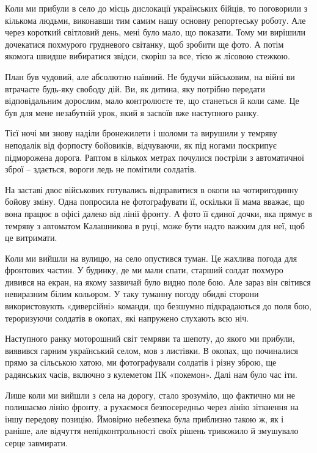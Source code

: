 Коли ми прибули в село до місць дислокації українських бійців, то поговорили з
кількома людьми, виконавши тим самим нашу основну репортеську роботу. Але через
короткий світловий день, мені було мало, що показати. Тому ми вирішили
дочекатися похмурого грудневого світанку, щоб зробити ще фото. А потім якомога
швидше вибиратися звідси, скоріш за все, тією ж лісовою стежкою.

План був чудовий, але абсолютно наївний. Не будучи військовим, на війні ви
втрачаєте будь-яку свободу дій. Ви, як дитина, яку потрібно передати
відповідальним дорослим, мало контролюєте те, що станеться й коли саме. Це був
для мене незабутній урок, який я засвоїв вже наступного ранку.


Тієї ночі ми знову наділи бронежилети і шоломи та вирушили у темряву неподалік
від форпосту бойовиків, відчуваючи, як під ногами поскрипує підморожена дорога.
Раптом в кількох метрах почулися постріли з автоматичної зброї – здається,
вороги ледь не помітили солдатів.


На заставі двоє військових готувались відправитися в окопи на чотиригодинну
бойову зміну. Одна попросила не фотографувати її, оскільки її мама вважає, що
вона працює в офісі далеко від лінії фронту. А фото її єдиної дочки, яка прямує
в темряву з автоматом Калашникова в руці, може бути надто важким для неї, щоб
це витримати.

Коли ми вийшли на вулицю, на село опустився туман. Це жахлива погода для
фронтових частин. У будинку, де ми мали спати, старший солдат похмуро дивився
на екран, на якому зазвичай було видно поле бою. Але зараз він світився
невиразним білим кольором. У таку туманну погоду обидві сторони використовують
«диверсійні» команди, що безшумно підкрадаються до поля бою, тероризуючи
солдатів в окопах, які напружено слухають всю ніч.

Наступного ранку моторошний світ темряви та шепоту, до якого ми прибули,
виявився гарним український селом, мов з листівки. В окопах, що починалися
прямо за сільською хатою, ми фотографували солдатів і різну зброю, ще
радянських часів, включно з кулеметом ПК «покемон». Далі нам було час іти.

Лише коли ми вийшли з села на дорогу, стало зрозуміло, що фактично ми не
полишаємо лінію фронту, а рухаємося безпосередньо через лінію зіткнення на іншу
передову позицію. Ймовірно небезпека була приблизно такою ж, як і раніше, але
відчуття непідконтрольності своїх рішень тривожило й змушувало серце завмирати.

